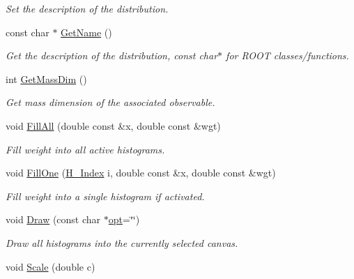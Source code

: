 \begin{DoxyCompactItemize}
\begin{DoxyCompactList}\small\item\em Set the description of the distribution. \end{DoxyCompactList}\item 
\hypertarget{classHistArray_a9fc7b2ffd135531fee3bdb47c4c00c2b}{}const char $\ast$ \hyperlink{classHistArray_a9fc7b2ffd135531fee3bdb47c4c00c2b}{Get\+Name} ()\label{classHistArray_a9fc7b2ffd135531fee3bdb47c4c00c2b}

\begin{DoxyCompactList}\small\item\em Get the description of the distribution, const char$\ast$ for R\+O\+O\+T classes/functions. \end{DoxyCompactList}\item 
\hypertarget{classHistArray_aa2f028b5c80394b8e5a449c137d43f63}{}int \hyperlink{classHistArray_aa2f028b5c80394b8e5a449c137d43f63}{Get\+Mass\+Dim} ()\label{classHistArray_aa2f028b5c80394b8e5a449c137d43f63}

\begin{DoxyCompactList}\small\item\em Get mass dimension of the associated observable. \end{DoxyCompactList}\item 
void \hyperlink{classHistArray_ae8d7189d1f2b9710a3228deac3eb1fa4}{Fill\+All} (double const \&x, double const \&wgt)
\begin{DoxyCompactList}\small\item\em Fill weight into all active histograms. \end{DoxyCompactList}\item 
void \hyperlink{classHistArray_a1f29f32f1eab7ee9315b93000387bd56}{Fill\+One} (\hyperlink{HistArray_8h_abdf25c9f0ab78c4243f63cb2bacf26d9}{H\+\_\+\+Index} i, double const \&x, double const \&wgt)
\begin{DoxyCompactList}\small\item\em Fill weight into a single histogram if activated. \end{DoxyCompactList}\item 
void \hyperlink{classHistArray_a4ebaa67b67958c1ee70ebdb056b5a389}{Draw} (const char $\ast$\hyperlink{structopt}{opt}=\char`\"{}\char`\"{})
\begin{DoxyCompactList}\small\item\em Draw all histograms into the currently selected canvas. \end{DoxyCompactList}\item 
\hypertarget{classHistArray_a64fb4832bfab2d8e2e47e56d99902236}{}void \hyperlink{classHistArray_a64fb4832bfab2d8e2e47e56d99902236}{Scale} (double c)\label{classHistArray_a64fb4832bfab2d8e2e47e56d99902236}


\end{DoxyCompactItemize}
